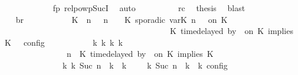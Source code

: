 \begin{isabellebody}
\ \ \ \ \ \ \ \ \ \ \isamarkupfalse%
\ fp\ relpowp{\isacharunderscore}Suc{\isacharunderscore}I{}\ \isamarkupfalse%
\ auto\isanewline
\ \ \ \ \ \ \ \ \isamarkupfalse%
\ rc\ \isamarkupfalse%
\ {\isacharquery}thesis\ \isamarkupfalse%
\ blast\isanewline
\ \ \ \ \ \ \isamarkupfalse%
\isanewline
\ \ \ \ \ \ \isamarkupfalse%
\ \isamarkupfalse%
\ br{}{\isacharcolon}\isanewline
\ \ \ \ \ \ \ \ {\isacartoucheopen}{\isasymrho}\ {\isasymin}\ {\isasymlbrakk}\ {\isacharparenleft}{\isacharparenleft}K\ {\isasymUp}\ n{\isacharparenright}\ {\isacharhash}\ {\isasymGamma}{\isacharparenright}{\isacharcomma}\ n\ {\isasymturnstile}\ {\isasymPsi}\ {\isasymtriangleright}\ {\isacharparenleft}{\isacharparenleft}K\ sporadic{\isasymsharp}\ {\isasymlparr}{\isasymtau}\isactrlsub v\isactrlsub a\isactrlsub r{\isacharparenleft}K\ n{\isacharparenright}\ {\isasymoplus}\ {\isasymdelta}{\isasymtau}{\isasymrparr}\ on\ K\isanewline
\ \ \ \ \ \ \ \ \ \ \ \ \ \ \ \ \ \ \ \ \ \ \ \ \ \ \ \ \ \ \ \ \ \ \ \ \ \ \ {\isacharhash}\ {\isacharparenleft}K\ time{\isacharminus}delayed{\isasymsharp}\ by\ {\isasymdelta}{\isasymtau}\ on\ K\ implies\ K\ {\isacharhash}\ {\isasymPhi}{\isacharparenright}\ {\isasymrbrakk}\isactrlsub c\isactrlsub o\isactrlsub n\isactrlsub f\isactrlsub i\isactrlsub g\isanewline
\ \ \ \ \ \ \ \ \ \ {\isasymLongrightarrow}\ {\isasymexists}{\isasymGamma}\isactrlsub k\ {\isasymPsi}\isactrlsub k\ {\isasymPhi}\isactrlsub k\ k{\isachardot}\isanewline
\ \ \ \ \ \ \ \ \ \ \ \ \ \ {\isacharparenleft}{\isacharparenleft}{\isasymGamma}{\isacharcomma}\ n\ {\isasymturnstile}\ {\isacharparenleft}{\isacharparenleft}K\ time{\isacharminus}delayed{\isasymsharp}\ by\ {\isasymdelta}{\isasymtau}\ on\ K\ implies\ K\ {\isacharhash}\ {\isasymPsi}{\isacharparenright}\ {\isasymtriangleright}\ {\isasymPhi}{\isacharparenright}\isanewline
\ \ \ \ \ \ \ \ \ \ \ \ \ \ {\isasymhookrightarrow}\isactrlbsup k\isactrlesup \ {\isacharparenleft}{\isasymGamma}\isactrlsub k{\isacharcomma}\ Suc\ n\ {\isasymturnstile}\ {\isasymPsi}\isactrlsub k\ {\isasymtriangleright}\ {\isasymPhi}\isactrlsub k{\isacharparenright}{\isacharparenright}\ {\isasymand}\ {\isasymrho}\ {\isasymin}\ {\isasymlbrakk}\ {\isasymGamma}\isactrlsub k{\isacharcomma}\ Suc\ n\ {\isasymturnstile}\ {\isasymPsi}\isactrlsub k\ {\isasymtriangleright}\ {\isasymPhi}\isactrlsub k\ {\isasymrbrakk}\isactrlsub c\isactrlsub o\isactrlsub n\isactrlsub f\isactrlsub i\isactrlsub g{\isacartoucheclose}\isanewline

\end{isabellebody}
